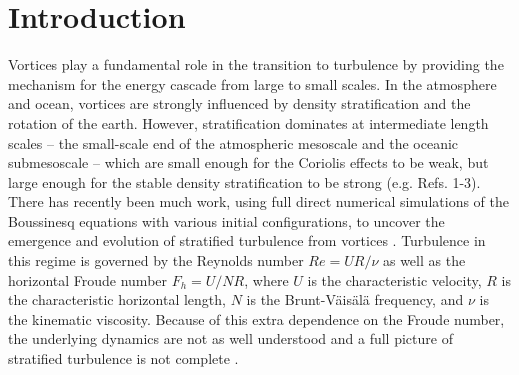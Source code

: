 \chapter{Introduction}



Vortices play a fundamental role in the transition to turbulence by providing the mechanism for the energy cascade from large to small scales. In the atmosphere and ocean, vortices are strongly influenced by density stratification and the rotation of the earth. However, stratification dominates at intermediate length scales -- the small-scale end of the atmospheric mesoscale and the oceanic submesoscale --  which are small enough for the Coriolis effects to be weak, but large enough for the stable density stratification to be strong (e.g. Refs. 1-3\nocite{riley2003,waitebartello2004,rileylindborg2013}).  There has recently been much work, using full direct numerical simulations of the Boussinesq equations with various initial configurations, to uncover the emergence and evolution of stratified turbulence from vortices \cite{waitesmol2008,delonclebc2008,augierbillant2011,augier2012}. Turbulence in this regime is governed by the Reynolds number $Re=UR/\nu$ as well as the horizontal Froude number $F_{h}=U/NR$, where $U$ is the characteristic velocity, $R$ is the characteristic horizontal length, $N$ is the Brunt-V\"{a}is\"{a}l\"{a} frequency, and $\nu$ is the kinematic viscosity. Because of this extra dependence on the Froude number, the underlying dynamics are not as well understood and a full picture of stratified turbulence is not complete \cite{rileylelong2000,riley2003,waitebartello2004,lindborg2006,rileylindborg2013}.  

